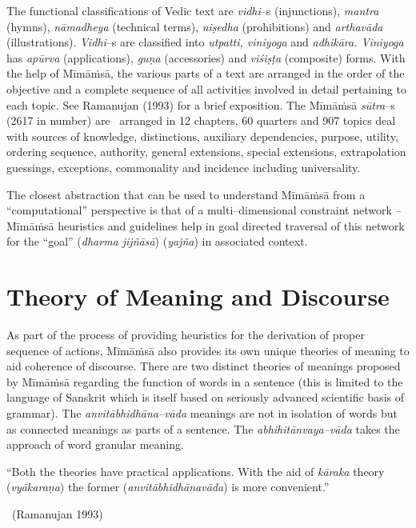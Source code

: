 The functional classifications of Vedic text are \textit{vidhi}–s (injunctions), \textit{mantra} (hymns), \textit{nāmadheya} (technical terms), \textit{niṣedha} (prohibitions) and \textit{arthavāda} (illustrations). \textit{Vidhi}–s are classified into \textit{utpatti, viniyoga} and \textit{adhikāra. Viniyoga} has \textit{apūrva} (applications), \textit{guṇa} (accessories) and \textit{viśiṣṭa} (composite) forms. With the help of Mīmāṁsā, the various parts of a text are arranged in the order of the objective and a complete sequence of all activities involved in detail pertaining to each topic. See Ramanujan (1993) for a brief exposition. The Mīmāṁsā \textit{sūtra}–s (2617 in number) are  arranged in 12 chapters, 60 quarters and 907 topics deal with sources of knowledge, distinctions, auxiliary dependencies, purpose, utility, ordering sequence, authority, general extensions, special extensions, extrapolation guessings, exceptions, commonality and incidence including universality.

The closest abstraction that can be used to understand Mīmāṁsā from a “computational” perspective is that of a multi–dimensional constraint network – Mīmāṁsā heuristics and guidelines help in goal directed traversal of this network for the “goal” (\textit{dharma jijñāsā}) (\textit{yajña}) in associated context.


\section*{Theory of Meaning and Discourse}

As part of the process of providing heuristics for the derivation of proper sequence of actions, Mīmāṁsā also provides its own unique theories of meaning to aid coherence of discourse. There are two distinct theories of meanings proposed by Mīmāṁsā regarding the function of words in a sentence (this is limited to the language of Sanskrit which is itself based on seriously advanced scientific basis of grammar). The \textit{anvitābhidhāna–vāda} meanings are not in isolation of words but as connected meanings as parts of a sentence. The \textit{abhihitānvaya–vāda} takes the approach of word granular meaning.

\begin{myquote}
“Both the theories have practical applications. With the aid of \textit{kāraka} theory (\textit{vyākaraṇa}) the former (\textit{anvitābhidhānavāda}) is more convenient.” 

~\hfill (Ramanujan 1993)
\end{myquote}

